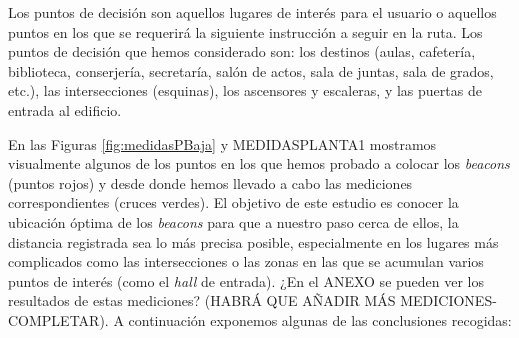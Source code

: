 Los puntos de decisión son aquellos lugares de interés para el usuario o aquellos puntos en los que se requerirá la siguiente instrucción a seguir en la ruta. Los puntos de decisión que hemos considerado son: los destinos (aulas, cafetería, biblioteca, conserjería, secretaría, salón de actos, sala de juntas, sala de grados, etc.), las intersecciones (esquinas), los ascensores y escaleras, y las puertas de entrada al edificio.

En las Figuras \ref{fig:medidasPBaja} y MEDIDASPLANTA1 mostramos visualmente algunos de los puntos en los que hemos probado a colocar los \textit{beacons} (puntos rojos) y desde donde hemos llevado a cabo las mediciones correspondientes (cruces verdes). El objetivo de este estudio es conocer la ubicación óptima de los \textit{beacons} para que a nuestro paso cerca de ellos, la distancia registrada sea lo más precisa posible, especialmente en los lugares más complicados como las intersecciones o las zonas en las que se acumulan varios puntos de interés (como el \textit{hall} de entrada). ¿En el ANEXO se pueden ver los resultados de estas mediciones? (HABRÁ QUE AÑADIR MÁS MEDICIONES-COMPLETAR). A continuación exponemos algunas de las conclusiones recogidas:

